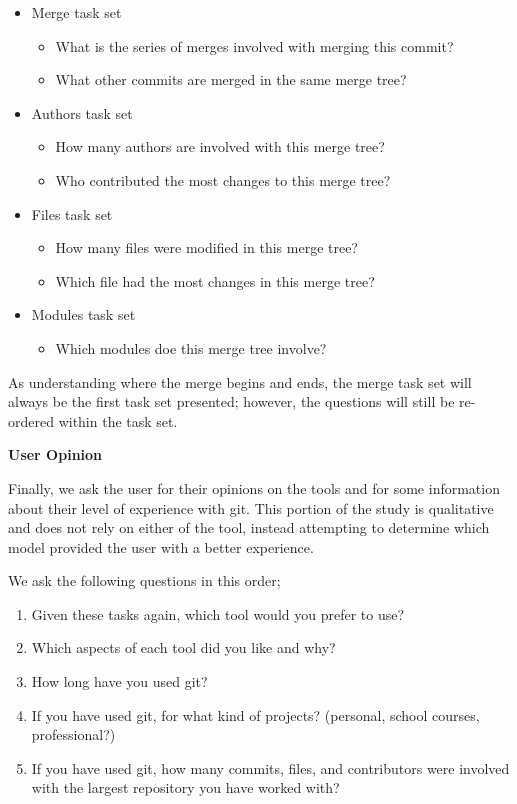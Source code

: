 \begin{itemize}
  \item Merge task set
    \begin{itemize}
      \item What is the series of merges involved with merging this
        commit?
      \item What other commits are merged in the same merge tree?
    \end{itemize}

  \item Authors task set
    \begin{itemize}
      \item How many authors are involved with this merge tree?
      \item Who contributed the most changes to this merge tree?
    \end{itemize}

  \item Files task set
    \begin{itemize}
      \item How many files were modified in this merge tree?
      \item Which file had the most changes in this merge tree?
    \end{itemize}

  \item Modules task set
    \begin{itemize}
      \item Which modules doe this merge tree involve?
    \end{itemize}
\end{itemize}

As understanding where the merge begins and ends, the merge task set
will always be the first task set presented; however, the questions will
still be re-ordered within the task set.


\textbf{User Opinion}

Finally, we ask the user for their opinions on the tools and for some
information about their level of experience with git. This portion of
the study is qualitative and does not rely on either of the tool,
instead attempting to determine which model provided the user with a
better experience.

We ask the following questions in this order;

\begin{enumerate}
  \item Given these tasks again, which tool would you prefer to use?
  \item Which aspects of each tool did you like and why?
  \item How long have you used git?
  \item If you have used git, for what kind of projects? (personal,
    school courses, professional?)
  \item If you have used git, how many commits, files, and contributors
    were involved with the largest repository you have worked with?
\end{enumerate}


